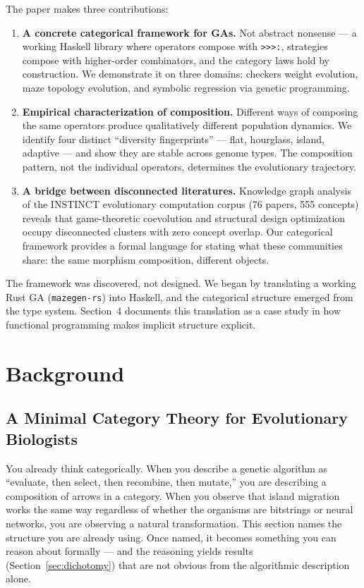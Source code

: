 \documentclass[10pt]{article}
\begin{document}
The paper makes three contributions:

\begin{enumerate}
  \item \textbf{A concrete categorical framework for GAs.} Not abstract nonsense --- a working Haskell library where operators compose with \texttt{>{>}{>}:}, strategies compose with higher-order combinators, and the category laws hold by construction. We demonstrate it on three domains: checkers weight evolution, maze topology evolution, and symbolic regression via genetic programming.

  \item \textbf{Empirical characterization of composition.} Different ways of composing the same operators produce qualitatively different population dynamics. We identify four distinct ``diversity fingerprints'' --- flat, hourglass, island, adaptive --- and show they are stable across genome types. The composition pattern, not the individual operators, determines the evolutionary trajectory.

  \item \textbf{A bridge between disconnected literatures.} Knowledge graph analysis of the INSTINCT evolutionary computation corpus (76 papers, 555 concepts) reveals that game-theoretic coevolution and structural design optimization occupy disconnected clusters with zero concept overlap. Our categorical framework provides a formal language for stating what these communities share: the same morphism composition, different objects.
\end{enumerate}

The framework was discovered, not designed. We began by translating a working Rust GA (\texttt{mazegen-rs}) into Haskell, and the categorical structure emerged from the type system. Section~4 documents this translation as a case study in how functional programming makes implicit structure explicit.

\section{Background}

\subsection{A Minimal Category Theory for Evolutionary Biologists}

You already think categorically. When you describe a genetic algorithm as ``evaluate, then select, then recombine, then mutate,'' you are describing a composition of arrows in a category. When you observe that island migration works the same way regardless of whether the organisms are bitstrings or neural networks, you are observing a natural transformation. This section names the structure you are already using. Once named, it becomes something you can reason about formally --- and the reasoning yields results (Section~\ref{sec:dichotomy}) that are not obvious from the algorithmic description alone.
\end{document}
